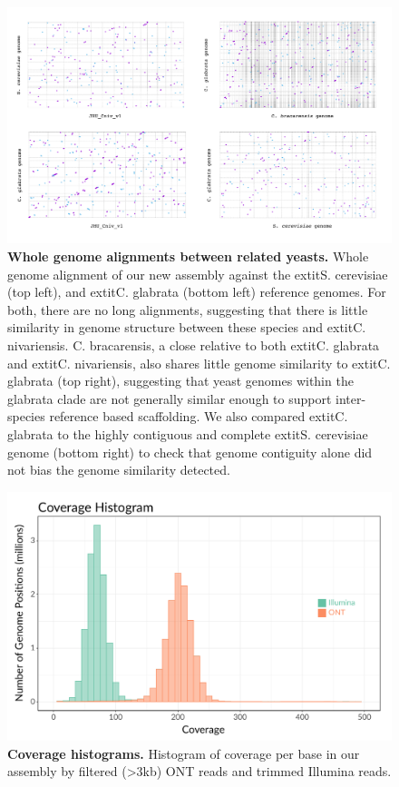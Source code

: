 \begin{figure}[!ht]
\centering
\includegraphics[width = 1\linewidth,keepaspectratio]{figure/speciesmum.pdf}
\caption[Whole genome alignments between related yeasts]{{\bf Whole genome alignments between related yeasts.} Whole genome alignment of our new assembly against the 	extit{S. cerevisiae} (top left), and 	extit{C. glabrata} (bottom left) reference genomes. For both, there are no long alignments, suggesting that there is little similarity in genome structure between these species and 	extit{C. nivariensis}. C. bracarensis, a close relative to both 	extit{C. glabrata} and 	extit{C. nivariensis}, also shares little genome similarity to 	extit{C. glabrata} (top right), suggesting that yeast genomes within the glabrata clade are not generally similar enough to support inter-species reference based scaffolding. We also compared 	extit{C. glabrata} to the highly contiguous and complete 	extit{S. cerevisiae} genome (bottom right) to check that genome contiguity alone did not bias the genome similarity detected. }
\label{fig:speciesmum}
\end{figure}



\begin{figure}[!ht]
\centering
\includegraphics[width = 1\linewidth,keepaspectratio]{figure/covhist.pdf}
\caption[Coverage histograms]{{\bf Coverage histograms.} Histogram of coverage per base in our assembly by filtered (>3kb) ONT reads and trimmed Illumina reads. }
\label{fig:covhist}
\end{figure}

